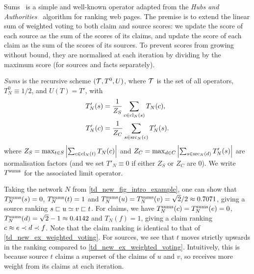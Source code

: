 Sums~\cite{pasternack2010} is a simple and well-known operator adapted from the
\emph{Hubs and Authorities}~\cite{kleinberg1999} algorithm for ranking web
pages. The premise is to extend the linear sum of weighted voting to both claim
and source scores: we update the score of each source as the sum of the scores
of its claims, and update the score of each claim as the sum of the scores of
its sources. To prevent scores from growing without bound, they are normalised
at each iteration by dividing by the maximum score (for sources and facts
separately).

\begin{definition}
    \emph{Sums} is the recursive scheme $(\mathcal{T}, T^0, U)$, where $\mathcal{T}$ is the set
    of all operators, $T^0_N \equiv 1 / 2$, and $U(T) = T'$, with
    \begin{align*}
        T'_N(s) &=
            \frac{1}{Z_S}
            \sum_{c \in \operatorname{cl}_N(s)}{
                T_N(c)
            },
        \\
        T'_N(c) &=
            \frac{1}{Z_C}
            \sum_{s \in \operatorname{src}_N(c)}{
                T'_N(s)
            }.
    \end{align*}
    where $
        Z_S = \max_{t \in S}{
            \left|
                \sum_{c \in \operatorname{cl}_N(t)}{
                    T_N(c)
                }
            \right|
        }
    $ and $
        Z_C = \max_{d \in C}{
            \left|
                \sum_{s \in \operatorname{src}_N(d)}{
                    T'_N(s)
                }
            \right|
        }
    $ are normalisation factors (and we set $T'_N \equiv 0$ if either $Z_S$ or
    $Z_C$ are 0). We write $T^{\operatorname{sums}}$ for the associated limit operator.
\end{definition}

Taking the network $N$ from \cref{td_new_fig_intro_example}, one can show that
$T^{\operatorname{sums}}_N(s) = 0$, $T^{\operatorname{sums}}_N(t) = 1$ and $T^{\operatorname{sums}}_N(u) = T^{\operatorname{sums}}_N(v) = \sqrt{2} / 2
\approx 0.7071$, giving a source ranking $s \sqsubset u \simeq v \sqsubset t$.  For claims,
we have $T^{\operatorname{sums}}_N(c) = T^{\operatorname{sums}}_N(e) = 0$, $T^{\operatorname{sums}}_N(d) = \sqrt{2} - 1 \approx
0.4142$ and $T_N(f) = 1$, giving a claim ranking $c \approx e \prec d \prec f$. Note
that the claim ranking is identical to that of
\cref{td_new_ex_weighted_voting}. For sources, we see that $t$ moves strictly
upwards in the ranking compared to \cref{td_new_ex_weighted_voting}.
Intuitively, this is because source $t$ claims a superset of the claims of $u$
and $v$, so receives more weight from its claims at each iteration.

